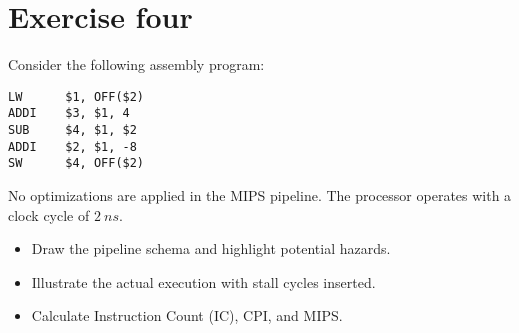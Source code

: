 \section{Exercise four}

Consider the following assembly program: 
\begin{verbatim}
LW      $1, OFF($2)
ADDI    $3, $1, 4
SUB     $4, $1, $2
ADDI    $2, $1, -8
SW      $4, OFF($2)
\end{verbatim}
No optimizations are applied in the MIPS pipeline. 
The processor operates with a clock cycle of $2\:ns$. 
\begin{itemize}
    \item Draw the pipeline schema and highlight potential hazards.
    \item Illustrate the actual execution with stall cycles inserted.
    \item Calculate Instruction Count (IC), CPI, and MIPS.\@
\end{itemize}


